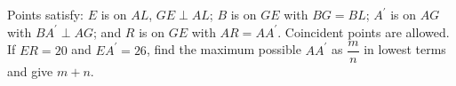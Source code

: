 Points satisfy: $E$ is on $AL$, $GE\perp AL$; $B$ is on $GE$ with $BG=BL$; $A^{\prime}$ is on $AG$ with $BA^{\prime}\perp AG$; and $R$ is on $GE$ with $AR=AA^{\prime}$. Coincident points are allowed. If $ER=20$ and $EA^{\prime}=26$, find the maximum possible $AA^{\prime}$ as $\dfrac{m}{n}$ in lowest terms and give $m+n$.
